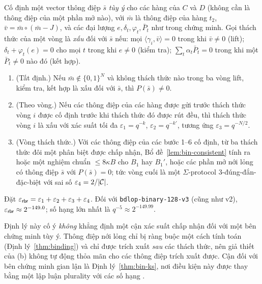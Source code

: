 \begin{theorem}
\label{thm:bin-rbr}
Cố định một vector thông điệp $\bar s$ \emph{tùy ý} cho các hàng của $C$ và $D$
(không cần là thông điệp của một phần mở nào), với $\bar m$ là thông điệp của
hàng $t_2$, $\bar v=\bar m\circ(\bar m-J)$, và các đại lượng
$e,\delta_t,\varphi_t,\bar P_t$ như trong chứng minh. Gọi thách thức của một
vòng là \emph{xấu} đối với $\bar s$ nếu:
mọi $\langle\gamma_i,\bar v\rangle=0$ trong khi $\bar v\ne0$ (lift);
$\delta_t+\varphi_t(e)=0$ cho mọi $t$ trong khi $e\ne0$ (kiểm tra);
$\sum_t\alpha_t\bar P_t=0$ trong khi một $\bar P_t\ne0$ nào đó (kết hợp).
\begin{enumerate}
\item[(a)] (Tất định.) Nếu $\bar m\notin\{0,1\}^N$ và không thách thức nào trong
  ba vòng lift, kiểm tra, kết hợp là xấu đối với $\bar s$, thì $P(\bar s)\ne0$.
\item[(b)] (Theo vòng.) Nếu các thông điệp của các hàng được gửi trước thách
  thức vòng $i$ được cố định trước khi thách thức đó được rút đều, thì thách
  thức vòng $i$ là xấu với xác suất tối đa $\varepsilon_1=q^{-k}$,
  $\varepsilon_2=q^{-k'}$, tương ứng $\varepsilon_3=q^{-N/2}$.
\item[(c)] (Vòng thách thức.) Với các thông điệp của các bước 1--6 cố định, từ
  ba thách thức đôi một phân biệt được chấp nhận,
  Bổ đề~\ref{lem:bin-consistent} tính ra hoặc một nghiệm \MSIS{} chuẩn
  $\le8\kappa B$ cho $B_1$ hay $B_1'$, hoặc các phần mở nới lỏng có thông
  điệp $\bar s$ với $P(\bar s)=0$; tức vòng cuối là một $\Sigma$-protocol
  $3$-đúng-đắn-đặc-biệt với sai số $\varepsilon_4=2/|\mathcal{C}|$.
\end{enumerate}
Đặt $\varepsilon_{\mathsf{rbr}}=\varepsilon_1+\varepsilon_2+\varepsilon_3+\varepsilon_4$. Đối với
\texttt{bdlop-binary-128-v3} (cũng như v2), $\varepsilon_{\mathsf{rbr}}\approx2^{-149.0}$; số hạng
lớn nhất là $q^{-5}\approx2^{-149.99}$.
\end{theorem}
\noindent
Định lý này cố ý \emph{không} khẳng định một cận xác suất chấp nhận đối với một
bên chứng minh tùy ý. Thông điệp nới lỏng chỉ bị ràng buộc một cách tính toán
(Định lý~\ref{thm:binding}) và chỉ được trích xuất \emph{sau} các thách thức,
nên giả thiết của (b) không tự động thỏa mãn cho các thông điệp trích xuất được.
Cận đối với bên chứng minh gian lận là Định lý~\ref{thm:bin-ks}, nơi điều kiện
này được thay bằng một lập luận plurality với các số hạng \MSIS{}.
